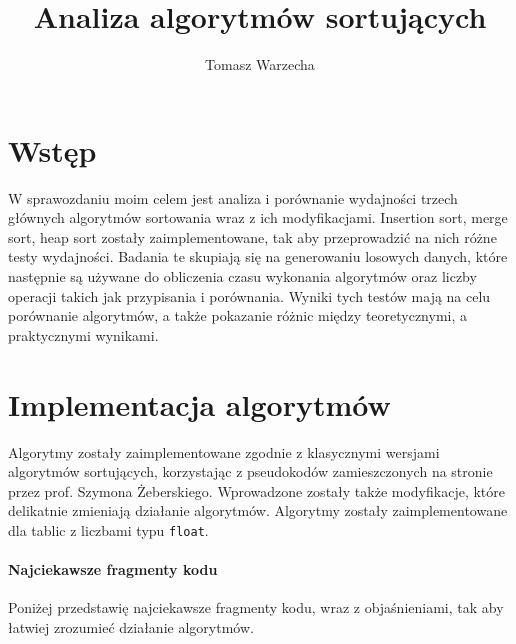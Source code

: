 \documentclass{article}
\title{Analiza algorytmów sortujących}
\author{Tomasz Warzecha}
\date{}
\begin{document}
	
	\maketitle
	
	\section{Wstęp}
	W sprawozdaniu moim celem jest analiza i porównanie wydajności trzech głównych algorytmów sortowania wraz z ich modyfikacjami. Insertion sort, merge sort, heap sort zostały zaimplementowane, tak aby przeprowadzić na nich różne testy wydajności. Badania te skupiają się na generowaniu losowych danych, które następnie są używane do obliczenia czasu wykonania algorytmów oraz liczby operacji takich jak przypisania i porównania. Wyniki tych testów mają na celu porównanie algorytmów, a także pokazanie różnic między teoretycznymi, a praktycznymi wynikami. 
	
	\section{Implementacja algorytmów} 
	Algorytmy zostały zaimplementowane zgodnie z klasycznymi wersjami algorytmów sortujących, korzystając z pseudokodów zamieszczonych na stronie przez prof. Szymona Żeberskiego. Wprowadzone zostały także modyfikacje, które delikatnie zmieniają działanie algorytmów. Algorytmy zostały zaimplementowane dla tablic z liczbami typu \texttt{float}.
	
	\paragraph{Najciekawsze fragmenty kodu\\}
	Poniżej przedstawię najciekawsze fragmenty kodu, wraz z objaśnieniami, tak aby łatwiej zrozumieć działanie algorytmów. 
	
\end{document}
